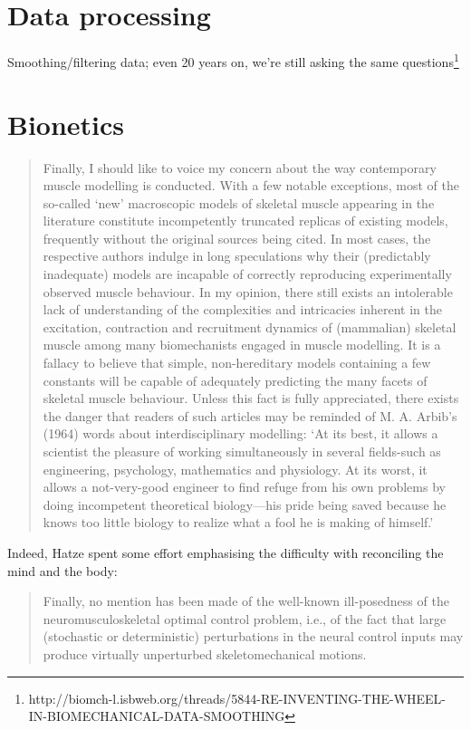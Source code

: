 \documentclass[a4paper]{article}
\begin{document}
\section{Data processing}

Smoothing/filtering data; even 20 years on, we're still asking the same questions\footnote{http://biomch-l.isbweb.org/threads/5844-RE-INVENTING-THE-WHEEL-IN-BIOMECHANICAL-DATA-SMOOTHING}

\section{Bionetics}

\begin{quote}
Finally, I should like to voice my concern about the way contemporary muscle modelling is conducted.
With a few notable exceptions, most of the so-called `new' macroscopic models of skeletal muscle appearing in the literature constitute incompetently truncated replicas of existing models, frequently without the original sources being cited.
In most cases, the respective authors indulge in long speculations why their (predictably inadequate) models are incapable of correctly reproducing experimentally observed muscle behaviour.
In my opinion, there still exists an intolerable lack of understanding of the complexities and intricacies inherent in the excitation, contraction and recruitment dynamics of (mammalian) skeletal muscle among many biomechanists engaged in muscle modelling.
It is a fallacy to believe that simple, non-hereditary models containing a few constants will be capable of adequately predicting the many facets of skeletal muscle behaviour.
Unless this fact is fully appreciated, there exists the danger that readers of such articles may be reminded of M. A. Arbib’s (1964) words about interdisciplinary modelling:
`At its best, it allows a scientist the pleasure of working simultaneously in several fields-such as engineering, psychology, mathematics and physiology. At its worst, it allows a not-very-good engineer to find refuge from his own problems by doing incompetent theoretical biology---his pride being saved because he knows too little biology to realize what a fool he is making of himself.'
\parencite{hatze1988-biomech-letter}
\end{quote}
Indeed, Hatze spent some effort emphasising the difficulty with reconciling the mind and the body:
\begin{quote}
Finally, no mention has been made of the well-known ill-posedness of the neuromusculoskeletal optimal control problem, i.e., of the fact that large (stochastic or deterministic) perturbations in the neural control inputs may produce virtually unperturbed skeletomechanical motions.
\parencite{hatze1988-biomech-letter}
\end{quote}
\end{document}
